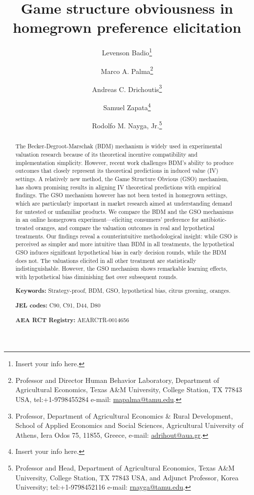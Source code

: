 \documentclass[12pt]{article}
\title{\textbf{Game structure obviousness in homegrown preference elicitation}}
\author[1]{Levenson Badio\thanks{Insert your info here.}}
\author[1]{Marco A. Palma\thanks{Professor and Director Human Behavior Laboratory, Department of Agricultural Economics, Texas A\&M University, College Station, TX  77843 USA, tel:+1-9798455284 e-mail: \href{mailto:mapalma@tamu.edu}{mapalma@tamu.edu}.}}
\author[2]{Andreas C. Drichoutis\thanks{Professor, Department of Agricultural Economics \& Rural Development, School of Applied Economics and Social Sciences, Agricultural University of Athens, Iera Odos 75, 11855, Greece, e-mail: \href{mailto:adrihout@aua.gr}{adrihout@aua.gr}.}}
\author[1]{Samuel Zapata\thanks{Insert your info here.}}
\author[1]{Rodolfo M. Nayga, Jr.\thanks{Professor and Head, Department of Agricultural Economics, Texas A\&M University, College Station, TX  77843 USA, and Adjunct Professor, Korea University; tel:+1-9798452116 e-mail: \href{mailto:rnayga@tamu.edu}{rnayga@tamu.edu}.}}
\affil[1]{Texas A\&M University}
\affil[2]{Agricultural University of Athens}
\date{}
\begin{document}
\maketitle

\onehalfspacing
\begin{abstract}
\noindent The Becker-Degroot-Marschak (BDM) mechanism is widely used in experimental valuation research because of its theoretical incentive compatibility and implementation simplicity. However, recent work challenges BDM's ability to produce outcomes that closely represent its theoretical predictions in induced value (IV) settings. A relatively new method, the Game Structure Obvious (GSO) mechanism, has shown promising results in aligning IV theoretical predictions with empirical findings. The GSO mechanism however has not been tested in homegrown settings, which are particularly important in market research aimed at understanding demand for untested or unfamiliar products. We compare the BDM and the GSO mechanisms in an online homegrown experiment---eliciting consumers' preference for antibiotic-treated oranges, and compare the valuation outcomes in real and hypothetical treatments. Our findings reveal a counterintuitive methodological insight: while GSO is perceived as simpler and more intuitive than BDM in all treatments, the hypothetical GSO induces significant hypothetical bias in early decision rounds, while the BDM does not. The valuations elicited in all other treatment are statistically indistinguishable. However, the GSO mechanism shows remarkable learning effects, with hypothetical bias diminishing fast over subsequent rounds. 

\textbf{Keywords:} Strategy-proof, BDM, GSO, hypothetical bias, citrus greening, oranges. 
	
\textbf{JEL codes:} C90, C91, D44, D80
 
 \textbf{AEA RCT Registry:} AEARCTR-0014656
 
 \end{abstract}


\onehalfspacing
\end{document}
